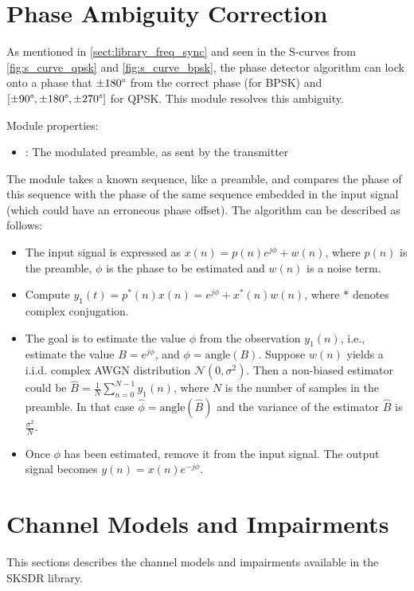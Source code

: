\section{Phase Ambiguity Correction}

As mentioned in \autoref{sect:library_freq_sync} and seen in the S-curves from \autoref{fig:s_curve_qpsk} and \autoref{fig:s_curve_bpsk}, the phase detector algorithm can lock onto a phase that $\pm 180\degree$ from the correct phase (for BPSK) and $[\pm 90\degree,\pm 180\degree,\pm 270\degree]$ for QPSK. This module resolves this ambiguity.

\noindent Module properties:
\begin{itemize}
  \item {}: The modulated preamble, as sent by the transmitter
\end{itemize}

The module takes a known sequence, like a preamble, and compares the phase of this sequence with the phase of the same sequence embedded in the input signal (which could have an erroneous phase offset). The algorithm can be described as follows:
\begin{itemize}
  \item The input signal is expressed as $x(n) = p(n)e^{j\phi} + w(n)$, where $p(n)$ is the preamble, $\phi$ is the phase to be estimated and $w(n)$ is a noise term.
  \item Compute $y_1(t) = p^*(n)x(n) = e^{j\phi} + x^*(n)w(n)$, where $*$ denotes complex conjugation.
  \item The goal is to estimate the value $\phi$ from the observation $y_1(n)$, i.e., estimate the value $B = e^{j\phi}$, and $\phi = \text{angle}(B)$. Suppose $w(n)$ yields a i.i.d. complex AWGN distribution $\mathcal{N}(0,\sigma^2)$. Then a non-biased estimator could be $\hat{B} = \frac{1}{N}\sum_{n=0}^{N-1} y_1(n)$, where $N$ is the number of samples in the preamble. In that case $\hat\phi = \text{angle}(\hat{B})$ and the variance of the estimator $\hat{B}$ is $\frac{\sigma^2}{N}$.
  \item Once $\phi$ has been estimated, remove it from the input signal. The output signal becomes $y(n) = x(n)e^{-j\phi}$.
\end{itemize}

\section{Channel Models and Impairments}
This sections describes the channel models and impairments available in the SKSDR library.

